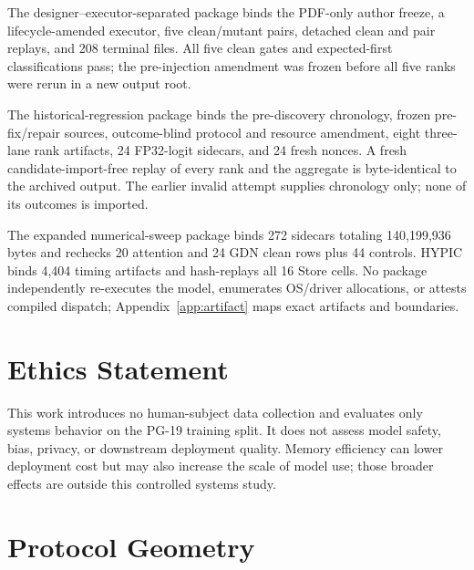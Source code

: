 \documentclass{article}
\begin{document}
The designer--executor-separated package binds the PDF-only author freeze, a
lifecycle-amended executor, five clean/mutant pairs, detached clean and pair
replays, and 208 terminal files.  All five clean gates and expected-first
classifications pass; the pre-injection amendment was frozen before all five
ranks were rerun in a new output root.

The historical-regression package binds the pre-discovery chronology, frozen
pre-fix/repair sources, outcome-blind protocol and resource amendment, eight
three-lane rank artifacts, 24 FP32-logit sidecars, and 24 fresh nonces.  A fresh
candidate-import-free replay of every rank and the aggregate is byte-identical
to the archived output.  The earlier invalid attempt supplies chronology only;
none of its outcomes is imported.

The expanded numerical-sweep package binds 272 sidecars totaling 140,199,936
bytes and rechecks 20 attention and 24 GDN clean rows plus 44 controls.  HYPIC
binds 4,404 timing artifacts and
hash-replays all 16 Store cells.  No package independently re-executes the
model, enumerates OS/driver allocations, or attests compiled dispatch;
Appendix~\ref{app:artifact} maps exact artifacts and boundaries.

\section{Ethics Statement}

This work introduces no human-subject data collection and evaluates only
systems behavior on the PG-19 training split.  It does not assess model safety,
bias, privacy, or downstream deployment quality.  Memory efficiency can lower
deployment cost but may also increase the scale of model use; those broader
effects are outside this controlled systems study.

\section{Protocol Geometry}
\label{app:protocol-geometry}
\end{document}
